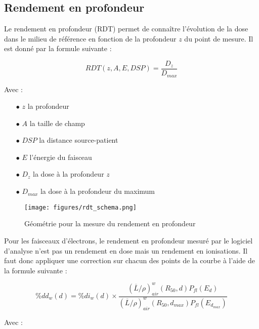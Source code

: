 \documentclass{article}
\begin{document}
\subsection{Rendement en profondeur}

Le rendement en profondeur (RDT) permet de connaître l'évolution de la dose dans le milieu de référence en fonction de la profondeur $z$ du point de mesure. Il est donné par la formule suivante :

\begin{equation}
  RDT(z, A, E, DSP) = \dfrac{D_z}{D_{max}}
  \label{eq_rdt}
\end{equation}

Avec :

\begin{itemize}
  \item[$\bullet$] $z$ la profondeur
  \item[$\bullet$] $A$ la taille de champ
  \item[$\bullet$] $DSP$ la distance source-patient
  \item[$\bullet$] $E$ l'énergie du faisceau
  \item[$\bullet$] $D_z$ la dose à la profondeur $z$
  \item[$\bullet$] $D_{max}$ la dose à la profondeur du maximum
\end{itemize}

\begin{figure}[h]
  \centering
  \texttt{[image: figures/rdt\_schema.png]}
  \caption{Géométrie pour la mesure du rendement en profondeur}
  \label{fig_rdt}
\end{figure}

\newpage
Pour les faisceaux d'électrons, le rendement en profondeur mesuré par le logiciel d'analyse n'est pas un rendement en dose mais un rendement en ionisations. Il faut donc appliquer une correction sur chacun des points de la courbe à l'aide de la formule suivante \cite{fm1991clinical}\cite{gerbi2009recommendations} :

\begin{equation}
  \%dd_w(d) = \%di_w(d) \times \dfrac{(\overline{L}/\rho)^w_{air}(R_{50}, d) P_{fl}(E_d)}{(\overline{L}/\rho)^w_{air} (R_{50}, d_{max}) P_{fl}(E_{d_{max}})}
\end{equation}

Avec :
\end{document}
